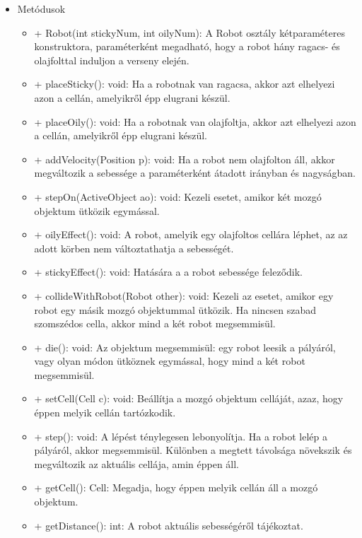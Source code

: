 \begin{itemize}
\begin{itemize}
	\end{itemize}
	\item Metódusok\newline
	\begin{itemize}
		\item + Robot(int stickyNum, int oilyNum): A Robot osztály kétparaméteres konstruktora, paraméterként megadható, hogy a robot hány ragacs- és olajfolttal induljon a verseny elején.
		\item + placeSticky(): void: Ha a robotnak van ragacsa, akkor azt elhelyezi azon a cellán, amelyikről épp elugrani készül.
		\item + placeOily(): void: Ha a robotnak van olajfoltja, akkor azt elhelyezi azon a cellán, amelyikről épp elugrani készül.
		\item + addVelocity(Position p): void: Ha a robot nem olajfolton áll, akkor megváltozik a sebessége a paraméterként átadott irányban és nagyságban.
		\item + stepOn(ActiveObject ao): void: Kezeli esetet, amikor két mozgó objektum ütközik egymással.
		\item + oilyEffect(): void: A robot, amelyik egy olajfoltos cellára léphet, az az adott körben nem változtathatja a sebességét. 
		\item + stickyEffect(): void: Hatására a a robot sebessége feleződik. 
		\item + collideWithRobot(Robot other): void: Kezeli az esetet, amikor egy robot egy másik mozgó objektummal ütközik. Ha nincsen szabad szomszédos cella, akkor mind a két robot megsemmisül. 
		\item + die(): void: Az objektum megsemmisül: egy robot leesik a pályáról, vagy olyan módon ütköznek egymással, hogy mind a két robot megsemmisül. 
		\item + setCell(Cell c): void: Beállítja a mozgó objektum celláját, azaz, hogy éppen melyik cellán tartózkodik.
		\item + step(): void: A lépést ténylegesen lebonyolítja. Ha a robot lelép a pályáról, akkor megsemmisül. Különben a megtett távolsága növekszik és megváltozik az aktuális cellája, amin éppen áll.
		\item + getCell(): Cell: Megadja, hogy éppen melyik cellán áll a mozgó objektum.
		\item + getDistance(): int: A robot aktuális sebességéről tájékoztat. 
		
	\end{itemize}
\end{itemize}

